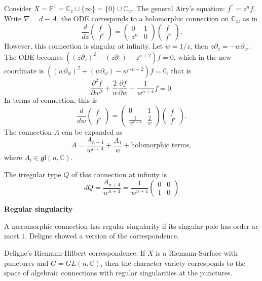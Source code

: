 Consider $X = \mathbb{P}^1 = \mathbb{C}_z \cup \{\infty\} = \{0\}\cup \mathbb{C}_w$. The general Airy's equation: $f^{''} = z^n f$. Write $\nabla = d - A$, the ODE corresponds to a holomorphic connection on $\mathbb{C}_z$, as in
$$\frac{d}{dz}\begin{pmatrix}
      f \\
      f'
    \end{pmatrix}
  = \begin{pmatrix}
  0 & 1 \\ z^n & 0
  \end{pmatrix}\begin{pmatrix}
      f \\
      f'
    \end{pmatrix}.$$
However, this connection is singular at infinity. Let $w =1/z$, then $z\partial_z = - w\partial_w$. The ODE becomes $((z\partial_z)^2 - (z\partial_z) - z^{n+2})f = 0$, which in the new coordinate is $((w\partial_w)^2 + (w\partial_w) - w^{-n-2})f = 0$, that is
$$\frac{\partial^2f}{\partial w^2} + \frac{2}{w}\frac{\partial f}{\partial w} - \frac{1}{w^{n+4}}f =0.$$
In terms of connection, this is
$$\frac{d}{dw}\begin{pmatrix}
      f \\
      f'
    \end{pmatrix}
  = \begin{pmatrix}
  0 & 1 \\ \frac{1}{w^{n+4}} & \frac{2}{w}
  \end{pmatrix}\begin{pmatrix}
      f \\
      f'
    \end{pmatrix}.$$
The connection $A$ can be expanded as
$$A = \frac{A_{n+4}}{w^{n+4}} + \frac{A_1}{w} + \text{holomorphic terms},$$
where $A_i \in \mathfrak{gl}(n,\mathbb{C})$.

The irregular type $Q$ of this connection at infinity is
$$dQ = \frac{A_{n+4}}{w^{n+4}} = \frac{1}{w^{n+4}}\begin{pmatrix} 0 & 0 \\ 1 & 0\end{pmatrix}$$

\medskip
\textbf{Regular singularity}

A meromorphic connection has regular singularity if its singular pole has order ar most $1$. Deligne showed a version of the correspondence.

Deligne's Riemann-Hilbert correspondence: If $X$ is a Riemann-Surface with punctures and $G =GL(n,\mathbb{C})$, then the character variety corresponds to the space of algebraic connections with regular singularities at the punctures.

